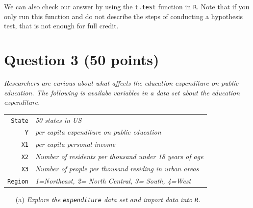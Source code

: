 \documentclass[12pt,letterpaper]{article}
\begin{document}
\vspace{.15cm}
\noindent  We can also check our answer by using the \texttt{t.test} function in \texttt{R}. Note that if you only run this function and do not describe the steps of conducting a hypothesis test, that is not enough for full credit.\\

  

\vspace{.5cm}
	\section*{Question 3 (50 points)}

\noindent \emph{Researchers are curious about what affects the education expenditure on public education. The following is availabe variables in a data set about the education expenditure.} \\
\vspace{.5cm}


\begin{tabular}{r|l}
	\texttt{State} &\emph{50 states in US} \\
	\texttt{Y} & \emph{per capita expenditure on public education}\\
	\texttt{X1} &\emph{per capita personal income} \\
	\texttt{X2} &  \emph{Number of residents per thousand under 18 years of age}\\
	\texttt{X3} &  \emph{Number of people per thousand residing in urban areas} \\
	\texttt{Region} &  \emph{1=Northeast, 2= North Central, 3= South, 4=West} \\
\end{tabular}

\vspace{.25cm}
\begin{itemize}
\item [(a)] \emph{Explore the \texttt{expenditure} data set and import data into \texttt{R}.}
\end{itemize}
\vspace{.5cm}
  
\vspace{.25cm}
\end{document}
